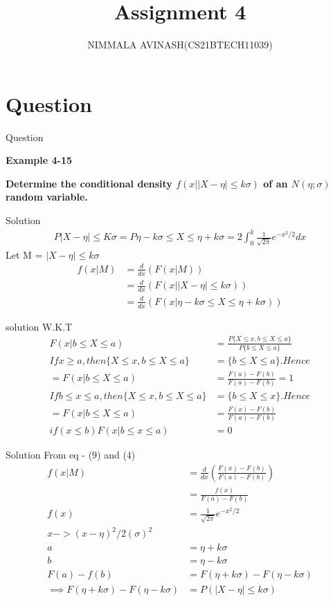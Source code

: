 \documentclass{beamer}
\title{Assignment 4}
\author{NIMMALA AVINASH(CS21BTECH11039)}
\begin{document}
\maketitle

\section{Question}
\begin{frame}{Question}
    
{\LARGE \textbf{Example 4-15\\}}

{\Large \textbf{Determine the conditional density  $ f(x|\vert X-\eta\vert\leq k\sigma) $ of an $N(\eta;\sigma)$ random variable.\\}}
\end{frame}
\begin{frame}{Solution}
\begin{align}
P{|X-\eta|\leq K\sigma} = P{\eta-k\sigma \leq X \leq \eta + k\sigma } = 2 \int_{0}^{k} \frac{1}{\sqrt{2\pi}} e^{-x^{2}/2}dx 
\end{align}
Let M = $ |X-\eta|\leq k\sigma $
\begin{align}
f(x|M) &= \frac{d}{dx}(F(x|M))\\
&=\frac{d}{dx}(F(x||X-\eta|\leq k\sigma))\\
&=\frac{d}{dx}(F(x|\eta-k\sigma\leq X \leq \eta + k\sigma))
\end{align}
\end{frame}
\begin{frame}{solution}
W.K.T 
\begin{align}
F(x|b\leq X \leq a) &= \frac{P\{X\leq x,b\leq X \leq a\}}{P\{b \leq X\leq a\}}\\
If x\geq a,then \{X \leq x,b\leq X \leq a\} &= \{b\leq X \leq a\}.Hence\\
=F(x|b\leq X \leq a) &= \frac{F(a)-F(b)}{F(a)-F(b)} = 1 \\
If b\leq x \leq a,then \{X\leq x,b \leq X \leq a\} &= \{b \leq X \leq x\}.Hence\\
=F(x|b\leq X \leq a) &= \frac{F(x)-F(b)}{F(a)-F(b)}\\
if(x\leq b) F(x | b\leq x \leq a) &= 0 
\end{align}
\end{frame}
\begin{frame}{Solution}
From eq - (9) and (4)
\begin{align}
f(x|M) &= \frac{d}{dx} (\frac{F(x)-F(b)}{F(a)-F(b)})\\
&= \frac{f(x)}{F(a)-F(b)}\\
f(x) &= \frac{1}{\sqrt{2\pi}}e^{-x^{2}/2}\\
x -> (x-\eta)^{2}/2(\sigma)^{2}\\
a &= \eta +k\sigma\\
b &= \eta -k\sigma\\
F(a)-f(b) &= F(\eta +k\sigma)-F(\eta -k\sigma)\\
\implies 
F(\eta +k\sigma)-F(\eta -k\sigma) &= P(|X-\eta|\leq k\sigma)
\end{align}
\end{frame}
\end{document}
